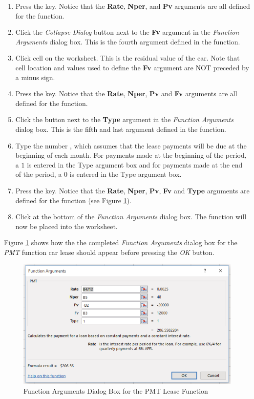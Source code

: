 \begin{enumerate}
	\item Press the  key. Notice that the \textbf{Rate}, \textbf{Nper}, and \textbf{Pv} arguments are all defined for the function.
	\item Click the \textit{Collapse Dialog} button next to the \textbf{Fv} argument in the \textit{Function Arguments} dialog box. This is the fourth argument defined in the function.
	\item Click cell  on the worksheet. This is the residual value of the car. Note that cell location and values used to define the \textbf{Fv} argument are NOT preceded by a minus sign.
	\item Press the  key. Notice that the \textbf{Rate}, \textbf{Nper}, \textbf{Pv} and \textbf{Fv} arguments are all defined for the function.
	\item Click the  button next to the \textbf{Type} argument in the \textit{Function Arguments} dialog box. This is the fifth and last argument defined in the function.
	\item Type the number , which assumes that the lease payments will be due at the beginning of each month. For payments made at the beginning of the period, a $ 1 $ is entered in the Type argument box and for payments made at the end of the period, a $ 0 $ is entered in the Type argument box.
	\item Press the  key. Notice that the \textbf{Rate}, \textbf{Nper}, \textbf{Pv}, \textbf{Fv} and \textbf{Type} arguments are defined for the function (see Figure \ref{02:fig34}).
	\item Click  at the bottom of the \textit{Function Arguments} dialog box. The function will now be placed into the worksheet.
\end{enumerate}

Figure \ref{02:fig34} shows how the the completed \textit{Function Arguments} dialog box for the \textit{PMT} function car lease should appear before pressing the \textit{OK} button.

\begin{figure}[H]
	\centering
	\includegraphics[width=\maxwidth{.95\linewidth}]{gfx/ch02_fig34}
	\caption{Function Arguments Dialog Box for the PMT Lease Function}
	\label{02:fig34}
\end{figure}

